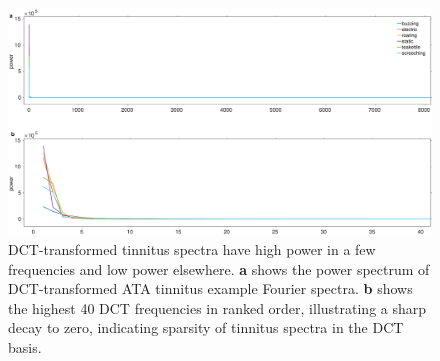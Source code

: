 \documentclass[journal]{IEEEtran}
\begin{document}
\begin{figure}[h]
	\centering
	\includegraphics[width=\linewidth]{gfx/target_signal_sparsity_3.eps}
	\caption{DCT-transformed tinnitus spectra have high power in a few frequencies
  and low power elsewhere. \textbf{a} shows the power spectrum of DCT-transformed
  ATA tinnitus example Fourier spectra. \textbf{b} shows the highest 40 DCT frequencies
  in ranked order, illustrating a sharp decay to zero, indicating sparsity
  of tinnitus spectra in the DCT basis.}
	\label{fig:target_signal_sparsity_3}
\end{figure}

\FloatBarrier




\end{document}
